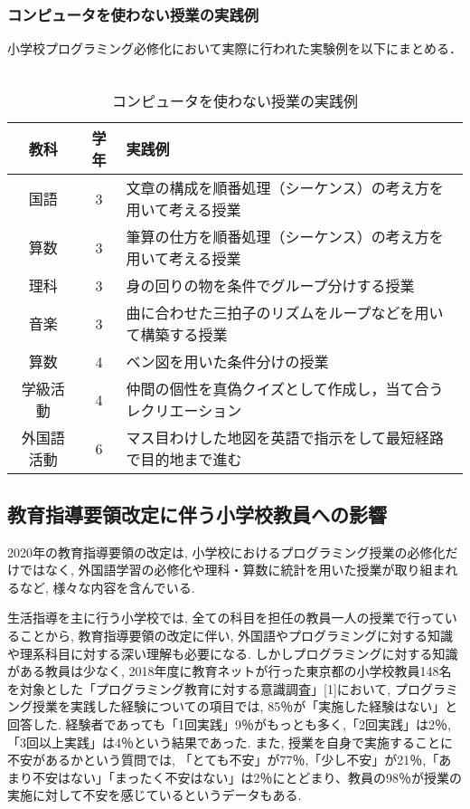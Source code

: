 \subsubsection{コンピュータを使わない授業の実践例}
小学校プログラミング必修化において実際に行われた実験例\cite{con}を以下にまとめる．\\
\\
\begin{table}[htb]
\begin{center}
\centering
    \caption{コンピュータを使わない授業の実践例}
  \begin{tabular}{|c|c|l|} \hline
    教科& 学年&実践例 \\ \hline
    国語& 3&文章の構成を順番処理（シーケンス）の考え方を用いて考える授業\\ \hline
    算数& 3&筆算の仕方を順番処理（シーケンス）の考え方を用いて考える授業\\ \hline
    理科& 3&身の回りの物を条件でグループ分けする授業\\ \hline
    音楽& 3&曲に合わせた三拍子のリズムをループなどを用いて構築する授業\\ \hline
    算数& 4&ベン図を用いた条件分けの授業\\ \hline
    学級活動& 4&仲間の個性を真偽クイズとして作成し，当て合うレクリエーション\\ \hline
    外国語活動& 6&マス目わけした地図を英語で指示をして最短経路で目的地まで進む\\ \hline
   
  \end{tabular}
  \label{tab:bamen1}
  \end{center}
\end{table}

\subsection{教育指導要領改定に伴う小学校教員への影響}
2020年の教育指導要領の改定は, 小学校におけるプログラミング授業の必修化だけではなく, 外国語学習の必修化や理科・算数に統計を用いた授業が取り組まれるなど, 様々な内容を含んでいる. 

生活指導を主に行う小学校では, 全ての科目を担任の教員一人の授業で行っていることから, 教育指導要領の改定に伴い, 外国語やプログラミングに対する知識や理系科目に対する深い理解も必要になる. しかしプログラミングに対する知識がある教員は少なく, 2018年度に教育ネットが行った東京都の小学校教員148名を対象とした「プログラミング教育に対する意識調査」[1]において, プログラミング授業を実践した経験についての項目では, 85％が「実施した経験はない」と回答した. 経験者であっても「1回実践」9％がもっとも多く,「2回実践」は2％,「3回以上実践」は4％という結果であった. また, 授業を自身で実施することに不安があるかという質問では, 「とても不安」が77％,「少し不安」が21％,「あまり不安はない」「まったく不安はない」は2％にとどまり、教員の98％が授業の実施に対して不安を感じているというデータもある. 

